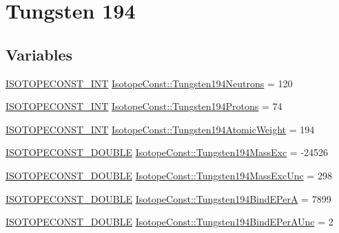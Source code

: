 \hypertarget{group___isotope_const-_tungsten-_w194}{}\section{Tungsten 194}
\label{group___isotope_const-_tungsten-_w194}
\subsection*{Variables}
\begin{DoxyCompactItemize}
\item 
\mbox{\hyperlink{group___isotope_const-_macros_ga5f18360b3e99483a35c32d789e62621c}{I\+S\+O\+T\+O\+P\+E\+C\+O\+N\+S\+T\+\_\+\+I\+NT}} \mbox{\hyperlink{group___isotope_const-_tungsten-_w194_gaf5bf5f4566d4e9a94a6dd93e9bc4280b}{Isotope\+Const\+::\+Tungsten194\+Neutrons}} = 120
\item 
\mbox{\hyperlink{group___isotope_const-_macros_ga5f18360b3e99483a35c32d789e62621c}{I\+S\+O\+T\+O\+P\+E\+C\+O\+N\+S\+T\+\_\+\+I\+NT}} \mbox{\hyperlink{group___isotope_const-_tungsten-_w194_gaf6a24f42f8315baa739fb7c6bb3ebe3e}{Isotope\+Const\+::\+Tungsten194\+Protons}} = 74
\item 
\mbox{\hyperlink{group___isotope_const-_macros_ga5f18360b3e99483a35c32d789e62621c}{I\+S\+O\+T\+O\+P\+E\+C\+O\+N\+S\+T\+\_\+\+I\+NT}} \mbox{\hyperlink{group___isotope_const-_tungsten-_w194_ga8534158d1140c65fb095d9f30df42e7a}{Isotope\+Const\+::\+Tungsten194\+Atomic\+Weight}} = 194
\item 
\mbox{\hyperlink{group___isotope_const-_macros_ga8f45a7272ce02c0b4c65c44636ed719a}{I\+S\+O\+T\+O\+P\+E\+C\+O\+N\+S\+T\+\_\+\+D\+O\+U\+B\+LE}} \mbox{\hyperlink{group___isotope_const-_tungsten-_w194_ga9b685815e42d31c648b2c8e4dd9f6990}{Isotope\+Const\+::\+Tungsten194\+Mass\+Exc}} = -\/24526
\item 
\mbox{\hyperlink{group___isotope_const-_macros_ga8f45a7272ce02c0b4c65c44636ed719a}{I\+S\+O\+T\+O\+P\+E\+C\+O\+N\+S\+T\+\_\+\+D\+O\+U\+B\+LE}} \mbox{\hyperlink{group___isotope_const-_tungsten-_w194_gab41c4922be8aee0dac1d76cd4853aef0}{Isotope\+Const\+::\+Tungsten194\+Mass\+Exc\+Unc}} = 298
\item 
\mbox{\hyperlink{group___isotope_const-_macros_ga8f45a7272ce02c0b4c65c44636ed719a}{I\+S\+O\+T\+O\+P\+E\+C\+O\+N\+S\+T\+\_\+\+D\+O\+U\+B\+LE}} \mbox{\hyperlink{group___isotope_const-_tungsten-_w194_ga79b2bdf16180062ae22c6820e098efb1}{Isotope\+Const\+::\+Tungsten194\+Bind\+E\+PerA}} = 7899
\item 
\mbox{\hyperlink{group___isotope_const-_macros_ga8f45a7272ce02c0b4c65c44636ed719a}{I\+S\+O\+T\+O\+P\+E\+C\+O\+N\+S\+T\+\_\+\+D\+O\+U\+B\+LE}} \mbox{\hyperlink{group___isotope_const-_tungsten-_w194_ga33cb5b383a0eb514ff35e19c11cfcc40}{Isotope\+Const\+::\+Tungsten194\+Bind\+E\+Per\+A\+Unc}} = 2

\end{DoxyCompactItemize}
